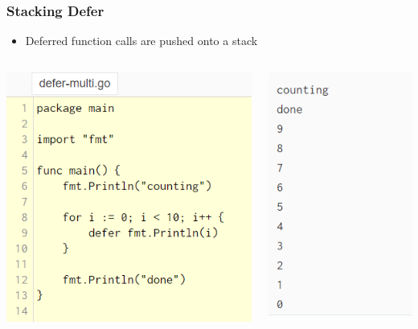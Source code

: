 \documentclass[14pt]{beamer}
\begin{document}
{
\begin{frame}
    \frametitle{Stacking Defer}
    \begin{itemize}
        \item Deferred function calls are pushed onto a stack
    \end{itemize}
    \begin{columns}
        \begin{column}{0.5\textwidth}
            \includegraphics[width=0.9\linewidth]{img/stackdefer.PNG}
        \end{column}
        \begin{column}{0.5\textwidth}
            \includegraphics[width=0.5\linewidth]{img/defeeoutput.PNG}
        \end{column}
    \end{columns}
\end{frame}
}
\end{document}
